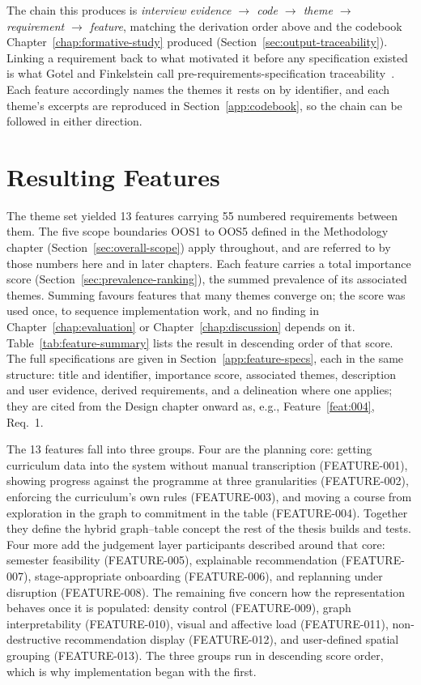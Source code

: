 The chain this produces is \emph{interview evidence $\rightarrow$ code $\rightarrow$ theme $\rightarrow$ requirement $\rightarrow$ feature}, matching the derivation order above and the codebook Chapter~\ref{chap:formative-study} produced (Section~\ref{sec:output-traceability}). Linking a requirement back to what motivated it before any specification existed is what Gotel and Finkelstein call pre-requirements-specification traceability~\cite[p.~96]{gotel_analysis_1994}. Each feature accordingly names the themes it rests on by identifier, and each theme's excerpts are reproduced in Section~\ref{app:codebook}, so the chain can be followed in either direction.

\section{Resulting Features}
\label{sec:resulting-features}

The theme set yielded 13 features carrying 55 numbered requirements between them. The five scope boundaries OOS1 to OOS5 defined in the Methodology chapter (Section~\ref{sec:overall-scope}) apply throughout, and are referred to by those numbers here and in later chapters. Each feature carries a total importance score (Section~\ref{sec:prevalence-ranking}), the summed prevalence of its associated themes. Summing favours features that many themes converge on; the score was used once, to sequence implementation work, and no finding in Chapter~\ref{chap:evaluation} or Chapter~\ref{chap:discussion} depends on it. Table~\ref{tab:feature-summary} lists the result in descending order of that score. The full specifications are given in Section~\ref{app:feature-specs}, each in the same structure: title and identifier, importance score, associated themes, description and user evidence, derived requirements, and a delineation where one applies; they are cited from the Design chapter onward as, e.g., Feature~\ref{feat:004}, Req.~1.

The 13 features fall into three groups. Four are the planning core: getting curriculum data into the system without manual transcription (FEATURE-001), showing progress against the programme at three granularities (FEATURE-002), enforcing the curriculum's own rules (FEATURE-003), and moving a course from exploration in the graph to commitment in the table (FEATURE-004). Together they define the hybrid graph--table concept the rest of the thesis builds and tests. Four more add the judgement layer participants described around that core: semester feasibility (FEATURE-005), explainable recommendation (FEATURE-007), stage-appropriate onboarding (FEATURE-006), and replanning under disruption (FEATURE-008). The remaining five concern how the representation behaves once it is populated: density control (FEATURE-009), graph interpretability (FEATURE-010), visual and affective load (FEATURE-011), non-destructive recommendation display (FEATURE-012), and user-defined spatial grouping (FEATURE-013). The three groups run in descending score order, which is why implementation began with the first.

